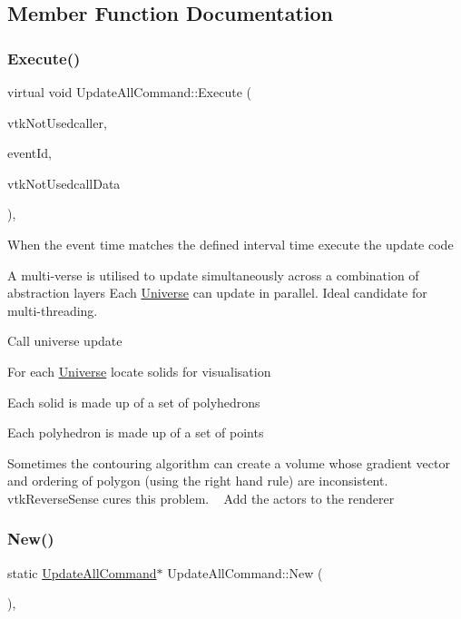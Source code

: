 \subsection{Member Function Documentation}
\mbox{\label{classUpdateAllCommand_a0a2dab315be55642c65d7fa1b2892ec8}} 
\subsubsection{\texorpdfstring{Execute()}{Execute()}}
{\footnotesize\ttfamily virtual void Update\+All\+Command\+::\+Execute (\begin{DoxyParamCaption}\item[{vtk\+Object $\ast$}]{vtk\+Not\+Usedcaller,  }\item[{unsigned long}]{event\+Id,  }\item[{void $\ast$}]{vtk\+Not\+Usedcall\+Data }\end{DoxyParamCaption})\hspace{0.3cm}{\ttfamily [inline]}, {\ttfamily [virtual]}}

When the event time matches the defined interval time execute the update code

A multi-\/verse is utilised to update simultaneously across a combination of abstraction layers Each \mbox{\hyperlink{classUniverse}{Universe}} can update in parallel. Ideal candidate for multi-\/threading.

Call universe update

For each \mbox{\hyperlink{classUniverse}{Universe}} locate solids for visualisation

Each solid is made up of a set of polyhedrons

Each polyhedron is made up of a set of points

Sometimes the contouring algorithm can create a volume whose gradient vector and ordering of polygon (using the right hand rule) are inconsistent. vtk\+Reverse\+Sense cures this problem. ~\newline
 Add the actors to the renderer \mbox{\label{classUpdateAllCommand_a97cd6ef1c68bb473aef27c898b175517}} 
\subsubsection{\texorpdfstring{New()}{New()}}
{\footnotesize\ttfamily static \mbox{\hyperlink{classUpdateAllCommand}{Update\+All\+Command}}$\ast$ Update\+All\+Command\+::\+New (\begin{DoxyParamCaption}{ }\end{DoxyParamCaption})\hspace{0.3cm}{\ttfamily [inline]}, {\ttfamily [static]}}

